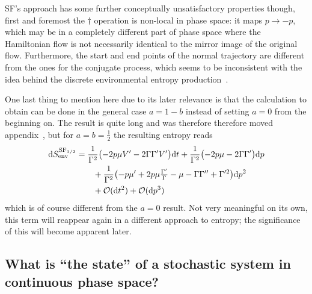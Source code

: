 SF's approach has some further conceptually unsatisfactory properties though, first and foremost the \(\dagger\) operation is non-local in phase space: it maps \(p\to-p\), which may be in a completely different part of phase space where the Hamiltonian flow is not necessarily identical to the mirror image of the original flow. Furthermore, the start and end points of the normal trajectory are different from the ones for the conjugate process, which seems to be inconsistent with the idea behind the discrete environmental entropy production~.

One last thing to mention here due to its later relevance is that the calculation to obtain  can be done in the general case \(a = 1-b\) instead of setting \(a=0\) from the beginning on. The result is quite long and was therefore therefore moved appendix~, but for \(a = b = \frac12\) the resulting entropy reads
%
\begin{equation}\begin{split}
	\label{eqn:sf entropy production 1/2}
	\mathrm{d}S_\text{env}^{\text{SF}_{1/2}} &=
	\frac1{\Gamma^2}\bigl(-2p\mu V'-2\Gamma\Gamma'V'\bigr)\mathrm{d} t
	+ \frac1{\Gamma^2}\bigl(-2p\mu-2\Gamma\Gamma'\bigr)\mathrm{d} p
	\\&\qquad
	+ \frac1{\Gamma^2}\bigl( -p\mu' + 2p\mu \tfrac{\Gamma'}\Gamma - \mu - \Gamma\Gamma'' + \Gamma'^2 \bigr) \mathrm{d} p^2
	\\&\qquad
	+ \mathcal{O}(\mathrm{d} t^2) + \mathcal{O}(\mathrm{d} p^3)
\end{split}\end{equation}
%
which is of course different from the \(a = 0\) result. Not very meaningful on its own, this term will reappear again in a different approach to entropy; the significance of this will become apparent later.




\subsection{What is ``the state'' of a stochastic system in continuous phase space?}

